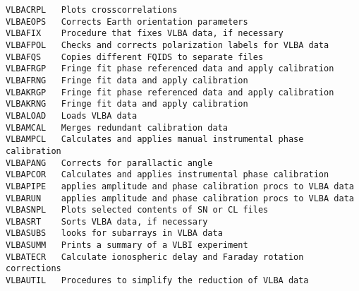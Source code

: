 \begin{verbatim}
VLBACRPL   Plots crosscorrelations
VLBAEOPS   Corrects Earth orientation parameters
VLBAFIX    Procedure that fixes VLBA data, if necessary
VLBAFPOL   Checks and corrects polarization labels for VLBA data
VLBAFQS    Copies different FQIDS to separate files
VLBAFRGP   Fringe fit phase referenced data and apply calibration
VLBAFRNG   Fringe fit data and apply calibration
VLBAKRGP   Fringe fit phase referenced data and apply calibration
VLBAKRNG   Fringe fit data and apply calibration
VLBALOAD   Loads VLBA data
VLBAMCAL   Merges redundant calibration data
VLBAMPCL   Calculates and applies manual instrumental phase calibration
VLBAPANG   Corrects for parallactic angle
VLBAPCOR   Calculates and applies instrumental phase calibration
VLBAPIPE   applies amplitude and phase calibration procs to VLBA data
VLBARUN    applies amplitude and phase calibration procs to VLBA data
VLBASNPL   Plots selected contents of SN or CL files
VLBASRT    Sorts VLBA data, if necessary
VLBASUBS   looks for subarrays in VLBA data
VLBASUMM   Prints a summary of a VLBI experiment
VLBATECR   Calculate ionospheric delay and Faraday rotation corrections
VLBAUTIL   Procedures to simplify the reduction of VLBA data
\end{verbatim}\eve


